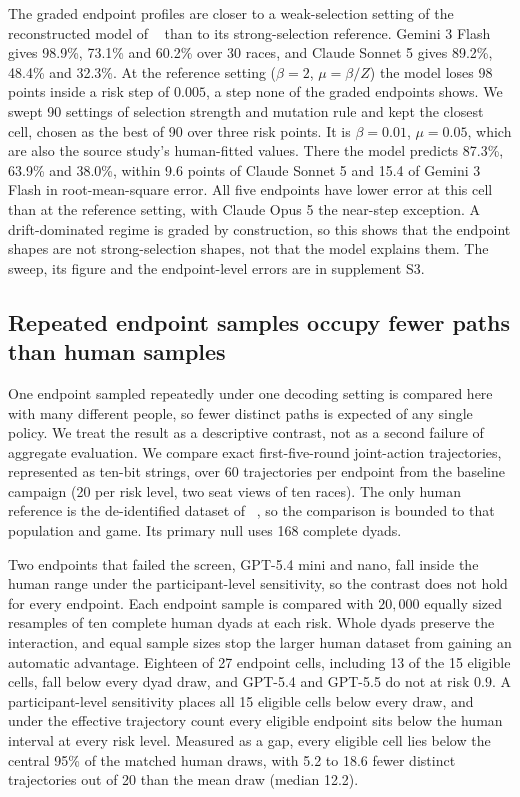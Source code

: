 \documentclass{article}
\DeclareRobustCommand{\citep}[1]{\cite{#1}}
\DeclareRobustCommand{\citet}[1]{\citeauthor{#1}~\shortcite{#1}}
\begin{document}
The graded endpoint profiles are closer to a weak-selection setting of the
reconstructed model of \citet{falling_behind_unsafe} than to its strong-selection
reference. Gemini 3 Flash gives 98.9\%, 73.1\% and 60.2\% over 30 races, and
Claude Sonnet 5 gives 89.2\%, 48.4\% and 32.3\%. At the reference setting
($\beta=2$, $\mu=\beta/Z$) the model loses 98 points inside a risk step of
$0.005$, a step none of the graded endpoints shows. We swept 90 settings of
selection strength and mutation rule and kept the closest cell, chosen as the
best of 90 over three risk points. It is $\beta=0.01$, $\mu=0.05$, which are
also the source study's human-fitted values. There the model predicts 87.3\%,
63.9\% and 38.0\%, within 9.6 points of Claude Sonnet 5 and 15.4 of Gemini 3
Flash in root-mean-square error. All five endpoints have lower error at this
cell than at the reference setting, with Claude Opus 5 the near-step exception.
A drift-dominated regime is graded by construction, so this shows that the
endpoint shapes are not strong-selection shapes, not that the model explains
them. The sweep, its figure and the endpoint-level errors are in supplement S3.

\subsection{Repeated endpoint samples occupy fewer paths than human samples}
\label{sec:results-diversity}

One endpoint sampled repeatedly under one decoding setting is compared here with
many different people, so fewer distinct paths is expected of any single policy.
We treat the result as a descriptive contrast, not as a second failure of
aggregate evaluation. We compare exact first-five-round joint-action
trajectories, represented as ten-bit strings, over 60 trajectories per endpoint
from the baseline campaign (20 per risk level, two seat views of ten races). The only human
reference is the de-identified dataset of \citet{falling_behind_unsafe}, so the
comparison is bounded to that population and game. Its primary null uses 168
complete dyads.

Two endpoints that failed the screen, GPT-5.4 mini and nano, fall inside the
human range under the participant-level sensitivity, so the contrast does not
hold for every endpoint. Each endpoint sample is compared with $20{,}000$
equally sized resamples of ten complete human dyads at each risk. Whole dyads
preserve the interaction, and equal sample sizes stop the larger human dataset
from gaining an automatic advantage. Eighteen of 27 endpoint cells, including 13
of the 15 eligible cells, fall below every dyad draw, and GPT-5.4 and GPT-5.5 do
not at risk $0.9$. A participant-level sensitivity places all 15 eligible cells
below every draw, and under the effective trajectory count \citep{hillDiversity1973}
every eligible endpoint sits below the human interval at every risk level.
Measured as a gap, every eligible cell lies below the central 95\% of the
matched human draws, with 5.2 to 18.6 fewer distinct trajectories out of 20
than the mean draw (median 12.2).
\end{document}
